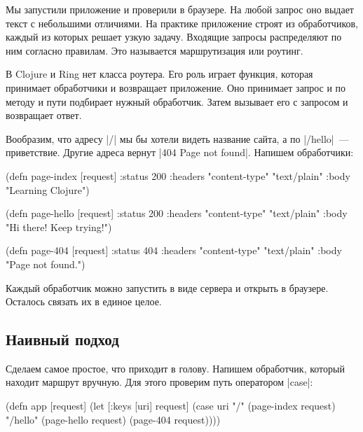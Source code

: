 
Мы запустили приложение и проверили в браузере. На любой запрос оно выдает текст
с небольшими отличиями. На практике приложение строят из обработчиков, каждый из
которых решает узкую задачу. Входящие запросы распределяют по ним согласно
правилам. Это называется маршрутизация или роутинг.

В Clojure и Ring нет класса роутера. Его роль играет функция, которая принимает
обработчики и возвращает приложение. Оно принимает запрос и по методу и пути
подбирает нужный обработчик. Затем вызывает его с запросом и возвращает ответ.


Вообразим, что адресу \spverb|/| мы бы хотели видеть название сайта, а по
\spverb|/hello|~--- приветствие. Другие адреса вернут \spverb|404 Page not found|.
Напишем обработчики:

\begin{english}
  \begin{clojure}
(defn page-index [request]
  {:status 200
   :headers {"content-type" "text/plain"}
   :body "Learning Clojure"})

(defn page-hello [request]
  {:status 200
   :headers {"content-type" "text/plain"}
   :body "Hi there! Keep trying!"})

(defn page-404 [request]
  {:status 404
   :headers {"content-type" "text/plain"}
   :body "Page not found."})
  \end{clojure}
\end{english}

Каждый обработчик можно запустить в виде сервера и открыть в браузере. Осталось
связать их в единое целое.

\subsection{Наивный подход}

Сделаем самое простое, что приходит в голову. Напишем обработчик, который
находит маршрут вручную. Для этого проверим путь оператором \spverb|case|:

\begin{english}
  \begin{clojure}
(defn app [request]
  (let [{:keys [uri]} request]
    (case uri
      "/"      (page-index request)
      "/hello" (page-hello request)
      (page-404 request))))
  \end{clojure}
\end{english}

